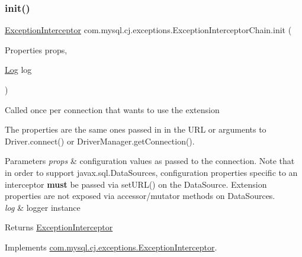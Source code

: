 \mbox{\label{classcom_1_1mysql_1_1cj_1_1exceptions_1_1_exception_interceptor_chain_ae29710eae9d22d426baabd3b2e589fec}} 
\subsubsection{\texorpdfstring{init()}{init()}}
{\footnotesize\ttfamily \mbox{\hyperlink{interfacecom_1_1mysql_1_1cj_1_1exceptions_1_1_exception_interceptor}{Exception\+Interceptor}} com.\+mysql.\+cj.\+exceptions.\+Exception\+Interceptor\+Chain.\+init (\begin{DoxyParamCaption}\item[{Properties}]{props,  }\item[{\mbox{\hyperlink{interfacecom_1_1mysql_1_1cj_1_1log_1_1_log}{Log}}}]{log }\end{DoxyParamCaption})}

Called once per connection that wants to use the extension

The properties are the same ones passed in in the U\+RL or arguments to Driver.\+connect() or Driver\+Manager.\+get\+Connection().


\begin{DoxyParams}{Parameters}
{\em props} & configuration values as passed to the connection. Note that in order to support javax.\+sql.\+Data\+Sources, configuration properties specific to an interceptor {\bfseries must} be passed via set\+U\+R\+L() on the Data\+Source. Extension properties are not exposed via accessor/mutator methods on Data\+Sources. \\
\hline
{\em log} & logger instance \\
\hline
\end{DoxyParams}
\begin{DoxyReturn}{Returns}
\mbox{\hyperlink{interfacecom_1_1mysql_1_1cj_1_1exceptions_1_1_exception_interceptor}{Exception\+Interceptor}} 
\end{DoxyReturn}


Implements \mbox{\hyperlink{interfacecom_1_1mysql_1_1cj_1_1exceptions_1_1_exception_interceptor_a5488d80601434446f3f5f73c27226417}{com.\+mysql.\+cj.\+exceptions.\+Exception\+Interceptor}}.

